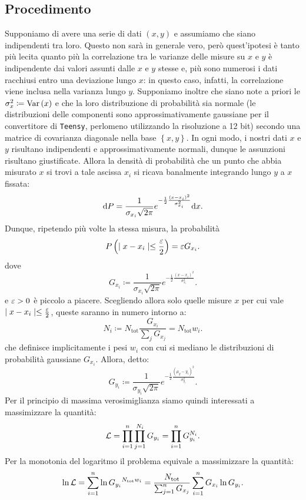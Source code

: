 \documentclass{article}[a4paper, oneside, 11pt]
\begin{document}
\subsection{Procedimento}
Supponiamo di avere una serie di dati $(x, y)$ e assumiamo che siano
indipendenti tra loro. Questo non sarà in generale vero, però quest'ipotesi
è tanto più lecita quanto più la correlazione tra le varianze delle misure su
$x$ e $y$ è indipendente dai valori assunti dalle $x$ e $y$ stesse e, più
sono numerosi i dati racchiusi entro una deviazione lungo $x$: in questo caso,
infatti, la correlazione viene inclusa nella varianza lungo $y$.
Supponiamo inoltre che siano note a priori le $\sigma_x ^2 \coloneqq \text{Var}\left(x\right)$
e che la loro distribuzione di probabilità sia normale (le distribuzioni
delle componenti sono approssimativamente gaussiane per il convertitore
di \verb+Teensy+, perlomeno utilizzando la risoluzione a 12 bit) secondo una 
matrice
di covarianza diagonale nella base $\left\{x, y\right\}$.
In ogni modo, i nostri dati $x$ e $y$ risultano indipendenti e
approssimativamente normali, dunque le assunzioni risultano giustificate. 
Allora la densità di probabilità che un punto che abbia misurato $x$ si trovi
a tale ascissa $x_i$ si ricava banalmente integrando lungo $y$ a $x$ fissata:
\[
	\mathrm{d} P = \frac{1}{\sigma_{x_i} \sqrt{2\pi}}
	e^{-\frac{1}{2}{\frac{(x - x_i)^2}{\sigma_{x_i}^2}}} \mathrm{d} x
.\] 
Dunque, ripetendo più volte la stessa misura, la probabilità
\[
	P\left(\mid x - x_i \mid \leq \frac{\varepsilon}{2} \right) = \varepsilon G_{x_i} 
.\]
dove \[
	G_{x_i} \coloneqq \frac{1}{\sigma_{x_i} \sqrt{2\pi}}
	e^{-\frac{1}{2}{\frac{(x - x_i)^2}{\sigma_{x_i}^2}}}
.\] 
e $\varepsilon > 0$ è piccolo a piacere. Scegliendo allora solo quelle misure $x$ per
cui vale $\mid x - x_i \mid \leq \frac{\varepsilon}{2}$, queste saranno in numero
intorno a:
\[
	N_i \coloneqq N_{\text{tot}} \frac{G_{x_i}}{\sum_j G_{x_j}} =
		N_{\text{tot}} w_i
.\] 
che definisce implicitamente i pesi $w_i$ con cui si mediano le distribuzioni
di probabilità gaussiane $G_{x_i}$.
Allora, detto:
\[
	G_{y_i} \coloneqq \frac{1}{\sigma_{y_i} \sqrt{2\pi}}
	e^{-\frac{1}{2}{\frac{(\mu_y - y_i)^2}{\sigma_{y_i}^2}}}
.\] 
Per il principio di massima verosimiglianza siamo quindi interessati a
massimizzare la quantità:
\[
	\mathcal L = \prod_{i=1}^{n} \prod_{j=1}^{N_i} G_{y_i} = 
	\prod_{i=1}^{n} G_{y_i}^{N_i}
.\] 
Per la monotonia del logaritmo il problema equivale a massimizzare la quantità:
\[
	\ln{\mathcal L} = \sum_{i=1}^{n}\ln{G_{y_i}}^{N_{\text{tot}}w_i} = 
	\frac{N_{\text{tot}}} {\sum_{j=1}^{n} G_{x_j}} 
	\sum_{i=1}^{n} G_{x_i} \ln{G_{y_i}}
.\] 
\end{document}
